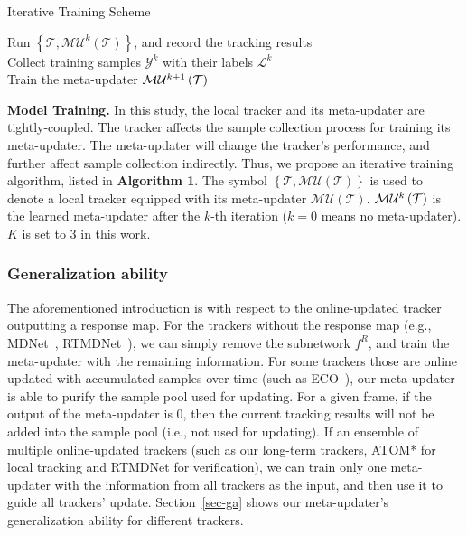 \documentclass[10pt,twocolumn,letterpaper]{article}
\begin{document}
\vspace{-2mm}
\begin{algorithm}[h]
\caption{Iterative Training Scheme}
\label{alg:Framwork}
\begin{algorithmic}[h]
\STATE
Run $\left\{ {\mathcal{T},\mathcal{MU}^{k}\left( \mathcal{T} \right)} \right\}$, and record the tracking results\\
Collect training samples ${\mathcal{Y}^k}$ with their labels ${\mathcal{L}^k}$\\
Train the meta-updater ${{\cal M}{{\cal U}^{k+1}}\left( {\cal T} \right)}$\\
\ENDFOR
\end{algorithmic}
\end{algorithm}
\vspace{-2mm}

\noindent \textbf{Model Training.} In this study, the local tracker and its meta-updater
are tightly-coupled.
The tracker affects the sample collection process for training its meta-updater.
The meta-updater will change the tracker's performance, and further affect sample
collection indirectly.
Thus, we propose an iterative training algorithm, listed in \textbf{Algorithm 1}.
The symbol $\left\{ {\mathcal{T},\mathcal{MU}\left( \mathcal{T} \right)} \right\}$
is used to denote a local tracker equipped with its meta-updater
${\mathcal{MU}\left( \mathcal{T} \right)}$.
${{\cal M}{{\cal U}^k}\left( {\cal T} \right)}$ is the learned meta-updater
after the $k$-th iteration ($k=0$ means no meta-updater).
$K$ is set to $3$ in this work.

\vspace{-4mm}
\subsubsection{Generalization ability}
\vspace{-2mm}
The aforementioned introduction is with respect to the online-updated tracker outputting
a response map.
For the trackers without the response map (e.g., MDNet~\cite{Nam-CVPR16-MDNet},
RTMDNet~\cite{RTMDNet}),  we can simply remove the subnetwork ${f^R}$,
and train the meta-updater with the remaining information.
For some trackers those are online updated with accumulated samples over time (such as
ECO~\cite{Danelljan-CVPR17-ECO}), our meta-updater is able to purify the sample
pool used for updating.
For a given frame, if the output of the meta-updater is 0, then the current tracking results
will not be added into the sample pool (i.e., not used for updating).
If an ensemble of multiple online-updated trackers (such as our long-term trackers, ATOM*
for local tracking and RTMDNet for verification),  we can train only one meta-updater with
the information from all trackers as the input, and then use it to guide all trackers' update.
Section~\ref{sec-ga} shows our meta-updater's generalization ability for different trackers.
\vspace{-2mm}
\end{document}
